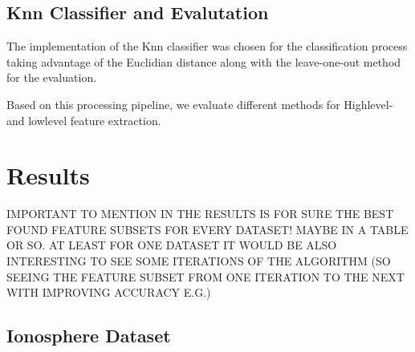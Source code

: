 \documentclass[11pt,onecolumn,a4paper]{report}
\begin{document}
\subsection{Knn Classifier and Evalutation }
The implementation of the Knn classifier was chosen for the classification process taking advantage of the Euclidian distance along with the leave-one-out method for the evaluation. 










Based on this processing pipeline, we evaluate different methods for Highlevel- and lowlevel feature extraction.

\section{Results}

IMPORTANT TO MENTION IN THE RESULTS IS FOR SURE THE BEST FOUND FEATURE SUBSETS FOR EVERY DATASET! MAYBE IN A TABLE OR SO. AT LEAST FOR ONE DATASET IT WOULD BE ALSO INTERESTING TO SEE SOME ITERATIONS OF THE ALGORITHM (SO SEEING THE FEATURE SUBSET FROM ONE ITERATION TO THE NEXT WITH IMPROVING ACCURACY E.G.)

\subsection{Ionosphere Dataset}
\end{document}
